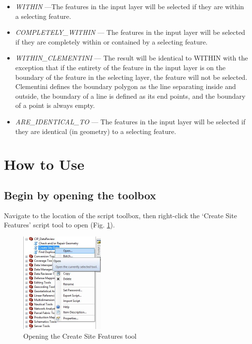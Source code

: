 \documentclass[openany]{book}
\theoremstyle{definition}
\theoremstyle{definition}
\theoremstyle{definition}
\theoremstyle{remark}
\begin{document}
\begin{enumerate}
\begin{itemize}
  \item
    \emph{WITHIN} ---The features in the input layer will be selected if
    they are within a selecting feature.\\
  \item
    \emph{COMPLETELY\_WITHIN} --- The features in the input layer will
    be selected if they are completely within or contained by a
    selecting feature.\\
  \item
    \emph{WITHIN\_CLEMENTINI} --- The result will be identical to WITHIN
    with the exception that if the entirety of the feature in the input
    layer is on the boundary of the feature in the selecting layer, the
    feature will not be selected. Clementini defines the boundary
    polygon as the line separating inside and outside, the boundary of a
    line is defined as its end points, and the boundary of a point is
    always empty.\\
  \item
    \emph{ARE\_IDENTICAL\_TO} --- The features in the input layer will
    be selected if they are identical (in geometry) to a selecting
    feature.
  \end{itemize}
\end{enumerate}

\section{How to Use}\label{how-to-use-1}

\subsection{Begin by opening the
toolbox}\label{begin-by-opening-the-toolbox-1}

Navigate to the location of the script toolbox, then right-click the
`Create Site Features' script tool to open (Fig. \ref{fig:csdopen}).

\begin{figure}[H]

{\centering \includegraphics[width=1.67in,]{figures/csd-open} 

}

\caption{Opening the Create Site Features tool}\label{fig:csdopen}
\end{figure}
\end{document}
